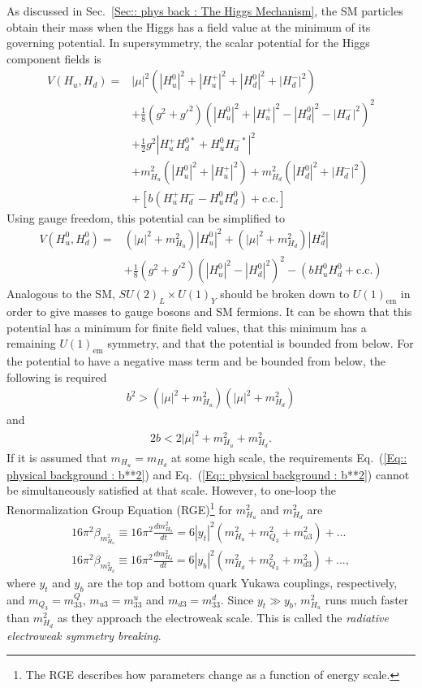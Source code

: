 \documentclass[twoside,english]{uiofysmaster}
\begin{document}
{As discussed in Sec.~\ref{Sec:: phys back : The Higgs Mechanism}, the SM particles obtain their mass when the Higgs has a field value at the minimum of its governing potential. In supersymmetry, the scalar potential for the Higgs component fields is
\begin{align}
V(H_u, H_d) =& |\mu|^2 (|H_u^0|^2 + |H_u^+|^2 + |H_d^0|^2 + |H_d^-|^2) \nonumber \\
&+ \frac{1}{8} (g^2+{g'}^2)(|H_u^0|^2 + |H_u^+|^2 - |H_d^0|^2 - |H_d^-|^2)^2 \nonumber \\
&+ \frac{1}{2} g^2 |H_u^+H_d^{0*} + H_u^0H_d^{-*}|^2 \nonumber \\
&+ m_{H_u}^2 (|H_u^0|^2 + |H_u^+|^2) + m_{H_d}^2 (|H_d^0|^2 + |H_d^-|^2) \nonumber \\
&+ [b (H_u^+H_d^- - H_u^0 H_d^0) + \text{c.c.}]
\end{align}
Using gauge freedom, this potential can be simplified to 
\begin{align}
V(H_u^0, H_d^0) =& (|\mu|^2 + m_{H_u}^2) |H_u^0|^2 + (|\mu|^2 + m_{H_d}^2)|H_d^2| \nonumber \\
&+ \frac{1}{8}(g^2 + {g'}^2)(|H_u^0|^2 - |H_d^0|^2)^2 - (bH_u^0 H_d^0 + \text{c.c.})
\end{align}
Analogous to the SM, $SU(2)_L \times U(1)_Y$ should be broken down to $U(1)_{\mathrm{em}}$ in order to give masses to gauge bosons and SM fermions. It can be shown that this potential has a minimum for finite field values, that this minimum has a remaining $U(1)_{\mathrm{em}}$ symmetry, and that the potential is bounded from below. For the potential to have a negative mass term and be bounded from below, the following is required
\begin{align}\label{Eq:: physical background : b**2}
b^2 > (|\mu|^2 + m_{H_u}^2)(|\mu|^2 + m_{H_d}^2)
\end{align}
and
\begin{align}\label{Eq:: physical background : 2b}
2b < 2 |\mu|^2 + m_{H_u}^2 + m^2_{H_d}.
\end{align}
If it is assumed that $m_{H_u} = m_{H_d}$ at some high scale,  the requirements Eq.\ (\ref{Eq:: physical background : b**2}) and Eq.\ (\ref{Eq:: physical background : b**2}) cannot be simultaneously satisfied at that scale. However, to one-loop the Renormalization Group Equation (RGE)\footnote{The RGE describes how parameters change as a function of energy scale.} for $m_{H_u}^2$ and $m_{H_d}^2$ are 
\begin{align}
16 \pi^2\beta_{m_{H_u}^2} \equiv 16 \pi^2 \frac{d m_{H_u}^2}{dt} = 6 |y_t|^2(m_{H_u}^2 + m_{Q_3}^2 + m_{u3}^2) +...\\
16 \pi^2\beta_{m_{H_d}^2} \equiv 16 \pi^2 \frac{d m_{H_d}^2}{dt} = 6 |y_b|^2(m_{H_d}^2 + m_{Q_3}^2 + m_{d3}^2) +...,
\end{align} 
where $y_t$ and $y_b$ are the top and bottom quark Yukawa couplings, respectively, and $m_{Q_3} = m_{33}^Q$, $m_{u3}= m_{33}^u$ and $m_{d3} = m_{33}^d$. Since $y_t \gg y_b$, $m_{H_u}^2$ runs much faster than $m_{H_d}^2$ as they approach the electroweak scale. This is called the \textit{radiative electroweak symmetry breaking}.

}
\end{document}
